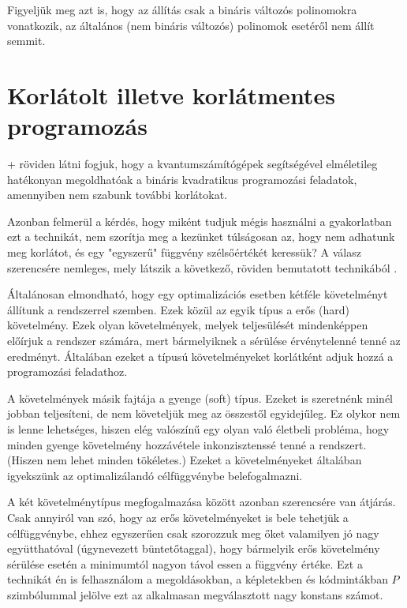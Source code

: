 Figyeljük meg azt is, hogy az állítás csak a bináris változós polinomokra vonatkozik, az általános (nem bináris változós) polinomok esetéről nem állít semmit.


\section{Korlátolt illetve korlátmentes programozás} \label{sec:constrainedVSunconstrained}

\Az+ röviden látni fogjuk, hogy a kvantumszámítógépek segítségével elméletileg hatékonyan megoldhatóak a bináris kvadratikus programozási feladatok, amennyiben nem szabunk további korlátokat.

Azonban felmerül a kérdés, hogy miként tudjuk mégis használni a gyakorlatban ezt a technikát, nem szorítja meg a kezünket túlságosan az, hogy nem adhatunk meg korlátot, és egy "egyszerű" függvény szélsőértékét keressük? A válasz szerencsére nemleges, mely látszik a következő, röviden bemutatott technikából \cite{DBLP:journals/corr/abs-1811-11538}. 

Általánosan elmondható, hogy egy optimalizációs esetben kétféle követelményt állítunk a rendszerrel szemben. Ezek közül az egyik típus a erős (hard) követelmény. Ezek olyan követelmények, melyek teljesülését mindenképpen előírjuk a rendszer számára, mert bármelyiknek a sérülése érvénytelenné tenné az eredményt. Általában ezeket a típusú követelményeket korlátként adjuk hozzá a programozási feladathoz.

A követelmények másik fajtája a gyenge (soft) típus. Ezeket is szeretnénk minél jobban teljesíteni, de nem követeljük meg az összestől egyidejűleg. Ez olykor nem is lenne lehetséges, hiszen elég valószínű egy olyan való életbeli probléma, hogy minden gyenge követelmény hozzávétele inkonzisztenssé tenné a rendszert. (Hiszen nem lehet minden tökéletes.) Ezeket a követelményeket általában igyekszünk az optimalizálandó célfüggvénybe belefogalmazni.

A két követelménytípus megfogalmazása között azonban szerencsére van átjárás. Csak annyiról van szó, hogy az erős követelményeket is bele tehetjük a célfüggvénybe, ehhez egyszerűen csak szorozzuk meg őket valamilyen jó nagy együtthatóval (úgynevezett büntetőtaggal), hogy bármelyik erős követelmény sérülése esetén a minimumtól nagyon távol essen a függvény értéke.
Ezt a technikát én is felhasználom a megoldásokban, a képletekben és kódmintákban $P$ szimbólummal jelölve ezt az alkalmasan megválasztott nagy konstans számot.

